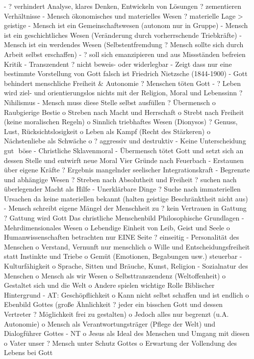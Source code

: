 \documentclass[11pt, paper=a4, twocolumn]{scrartcl}
\begin{document}
-	? verhindert Analyse, klares Denken, Entwickeln von Lösungen ? zementieren Verhältnisse
-	Mensch ökonomisches und materielles Wesen ? materielle Lage > geistige
-	Mensch ist ein Gemeinschaftswesen (autonom nur in Gruppe)
-	Mensch ist ein geschichtliches Wesen (Veränderung durch vorherrschende Triebkräfte)
-	Mensch ist ein werdendes Wesen (Selbstentfremdung ? Mensch sollte sich durch Arbeit selbst erschaffen)
-	? soll sich emanzipieren und aus Missständen befreien
Kritik
-	Transzendent ? nicht beweis- oder widerlegbar
-	Zeigt dass nur eine bestimmte Vorstellung von Gott falsch ist
Friedrich Nietzsche (1844-1900)
-	Gott behindert menschliche Freiheit & Autonomie ? Menschen töten Gott
-	? Leben wird ziel- und orientierungslos
nichts mit der Religion, Moral und Lebenssinn ? Nihilismus
-	Mensch muss diese Stelle selbst ausfüllen
? Übermensch
o	Raubgierige Bestie
o	Streben nach Macht und Herrschaft
o	Strebt nach Freiheit (keine moralischen Regeln)
o	Sinnlich triebhaftes Wesen (Dionysos) ? Genuss, Lust, Rücksichtslosigkeit
o	Leben als Kampf (Recht des Stärkeren)
o	Nächstenliebe als Schwäche
o	? aggressiv und destruktiv
-	Keine Unterscheidung gut  böse
-	Christliche Sklavenmoral
-	Übermensch tötet Gott und setzt sich an dessen Stelle und entwirft neue Moral
Vier Gründe nach Feuerbach
-	Erstaunen über eigene Kräfte ? Ergebnis mangelnder seelischer Integrationskraft
-	Begrenzte und abhängige Wesen ? Streben nach Absolutheit und Freiheit ? suchen nach überlegender Macht als Hilfe
-	Unerklärbare Dinge ? Suche nach immateriellen Ursachen da keine materiellen bekannt (halten geistige Beschränktheit nicht aus)
-	Mensch schreibt eigene Mängel der Menschheit zu ? kein Vertrauen in Gattung ? Gattung wird Gott
Das christliche Menschenbild
Philosophische Grundlagen
-	Mehrdimensionales Wesen
o	Lebendige Einheit von Leib, Geist und Seele
o	Humanwissenschaften betrachten nur EINE Seite ? einseitig
-	Personalität des Menschen
o	Verstand, Vernunft nur menschlich
o	Wille und Entscheidungsfreiheit statt Instinkte und Triebe
o	Gemüt (Emotionen, Begabungen usw.) steuerbar
-	Kulturfähigkeit
o	Sprache, Sitten und Bräuche, Kunst, Religion
-	Sozialnatur des Menschen
o	Mensch als wir Wesen
o	Selbsttranszendenz (Weltoffenheit)
o	Gestaltet sich und die Welt
o	Andere spielen wichtige Rolle
Biblischer Hintergrund
-	AT: Geschöpflichkeit
o	Kann nicht selbst schaffen und ist endlich
o	Ebenbild Gottes (große Ähnlichkeit ? jeder ein bisschen Gott und dessen Vertreter ? Möglichkeit frei zu gestalten)
o	Jedoch alles nur begrenzt (u.A. Autonomie)
o	Mensch als Verantwortungsträger (Pflege der Welt) und Dialogführer Gottes
-	NT
o	Jesus als Ideal des Menschen und Umgang mit diesen
o	Vater unser ? Mensch unter Schutz Gottes
o	Erwartung der Vollendung des Lebens bei Gott
\end{document}
